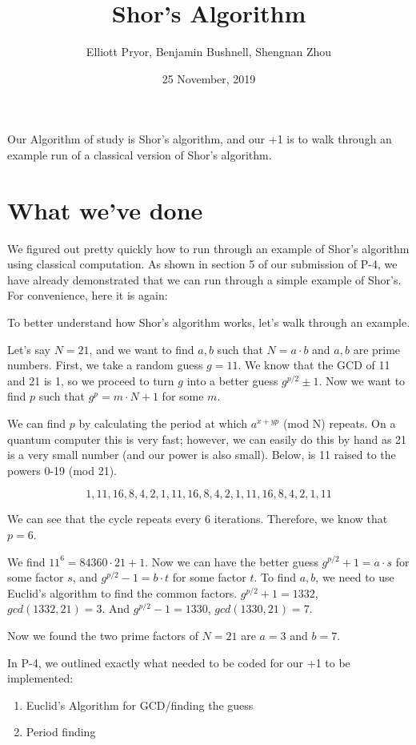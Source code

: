 \documentclass[a4paper]{article}
\title{Shor's Algorithm}
\author{Elliott Pryor, Benjamin Bushnell, Shengnan Zhou}
\date{25 November, 2019}
\begin{document}
\maketitle %

Our Algorithm of study is Shor's algorithm, and our +1 is to walk through an
example run of a classical version of Shor's algorithm.

\section{What we've done}

We figured out pretty quickly how to run through an example of Shor's algorithm
using classical computation. As shown in section 5 of our submission of P-4, we have already
demonstrated that we can run through a simple example of Shor's. For convenience, here it is again:

To better understand how Shor's algorithm works, let's walk through an example.

Let's say $N=21$, and we want to find $a, b$ such that $N = a \cdot b$ and $a, b$ are prime numbers.
First, we take a random guess $g=11$. We know that the GCD of 11 and 21 is 1, so we proceed to turn $g$ into a better guess $g^{p/2} \pm 1$.
Now we want to find $p$ such that $g^p = m \cdot N + 1$ for some $m$.

We can find $p$ by calculating the period at which $a ^{x+ yp}$ (mod N) repeats. On a quantum computer this is very fast;
however, we can easily do this by hand as 21 is a very small number (and our power is also small).
Below, is 11 raised to the powers 0-19 (mod 21).

$$1, 11, 16, 8, 4, 2, 1, 11, 16, 8, 4, 2, 1, 11, 16, 8, 4, 2, 1, 11$$

We can see that the cycle repeats every 6 iterations. Therefore, we know that $p = 6$.

We find $11^ 6 = 84360 \cdot 21 + 1$. Now we can have the better guess $g^{p/2} + 1 = a \cdot s$ for some factor $s$,
and $g^{p/2} - 1 = b \cdot t$ for some factor $t$. To find $a,b$, we need to use Euclid's algorithm to find the common factors.
$g^{p/2} + 1 = 1332$, $gcd(1332, 21) = 3$. And $g^{p/2} - 1 = 1330$, $gcd(1330, 21) = 7$.

Now we found the two prime factors of $N=21$ are $a = 3$ and $b = 7$.

\hrulefill

In P-4, we outlined exactly what needed to be coded for our +1 to be implemented:
\begin{enumerate}
    \item Euclid's Algorithm for GCD/finding the guess
    \item Period finding
\end{enumerate}
\end{document}
